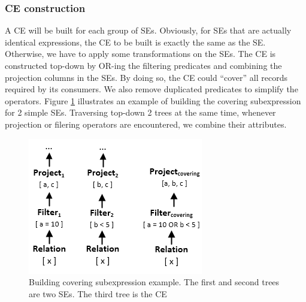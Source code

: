 
\subsubsection{CE construction}
\label{sec:ce-construction}
A CE will be built for each group of SEs. Obviously, for SEs that are actually identical expressions, the CE to be built is exactly the same as the SE. Otherwise, we have to apply some transformations on the SEs. The CE is constructed top-down by OR-ing the filtering predicates and combining the projection columns in the SEs. By doing so, the CE could ``cover'' all records required by its consumers. We also remove duplicated predicates to simplify the operators. Figure \ref{fig:covering} illustrates an example of building the covering subexpression for 2 simple SEs. Traversing top-down 2 trees at the same time, whenever projection or filering operators are encountered, we combine their attributes.

\begin{figure}[!htb]
	\centering
	\includegraphics[scale=0.75]{figures/covering}
	\caption{Building covering subexpression example. The first and second trees are two SEs. The third tree is the CE}
	\label{fig:covering}
\end{figure}
